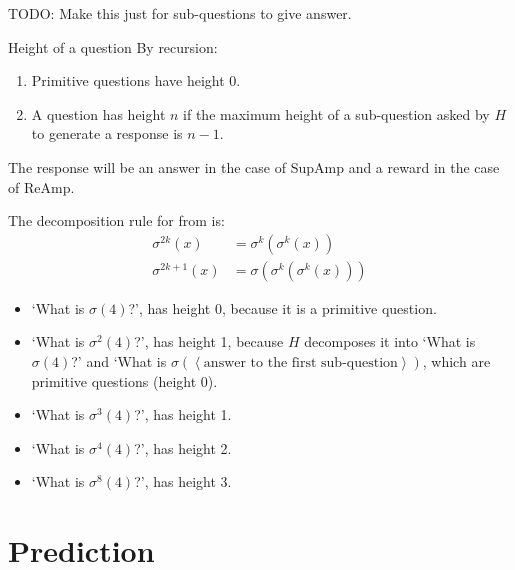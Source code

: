 \documentclass{farlamp}
\begin{document}
TODO: Make this just for sub-questions to give answer.
\begin{definition}{Height of a question} By recursion:
    \begin{enumerate}
    \item Primitive questions have height 0.
    \item A question has height $n$ if the maximum height of a sub-question
        asked by $H$ to generate a response is $n-1$.
    \end{enumerate}
The response will be an answer in the case of SupAmp and a reward in the case of
ReAmp.
\end{definition}

\begin{example}
    The decomposition rule for  from \textcite[table
    3]{CSASupAmp} is:
    \begin{align}
        \sigma^{2k}(x) &= \sigma^k(\sigma^k(x)) \\
        \sigma^{2k+1}(x) &= \sigma(\sigma^k(\sigma^k(x)))
    \end{align}

    \begin{itemize}
        \item ‘What is $\sigma(4)$?’, has height 0, because it is a primitive
            question.
        \item ‘What is $\sigma^2(4)$?’, has height 1, because $H$ decomposes it
            into ‘What is $\sigma(4)$?’ and ‘What is $\sigma(\left<\text{answer
            to the first sub-question}\right>)$, which are primitive questions
            (height 0).
        \item ‘What is $\sigma^3(4)$?’, has height 1.
        \item ‘What is $\sigma^4(4)$?’, has height 2.
        \item ‘What is $\sigma^8(4)$?’, has height 3.
    \end{itemize}
\end{example}


\section{Prediction}
\label{sec:prediction}
\end{document}
